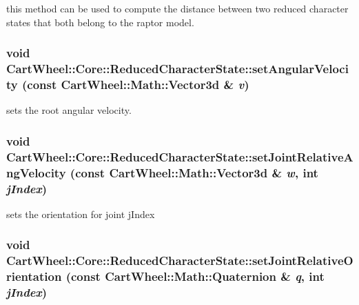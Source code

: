 \label{classCartWheel_1_1Core_1_1ReducedCharacterState_ac18db83455bbd84305928cdf1330ceb1}
this method can be used to compute the distance between two reduced character states that both belong to the raptor model. \hypertarget{classCartWheel_1_1Core_1_1ReducedCharacterState_aae884d8d365bea8c9ca4e0b6b59bc25c}{
\subsubsection[{setAngularVelocity}]{\setlength{\rightskip}{0pt plus 5cm}void CartWheel::Core::ReducedCharacterState::setAngularVelocity (const {\bf CartWheel::Math::Vector3d} \& {\em v})}}
\label{classCartWheel_1_1Core_1_1ReducedCharacterState_aae884d8d365bea8c9ca4e0b6b59bc25c}
sets the root angular velocity. \hypertarget{classCartWheel_1_1Core_1_1ReducedCharacterState_ae11d4640b70a6168de15e676ab65977f}{
\subsubsection[{setJointRelativeAngVelocity}]{\setlength{\rightskip}{0pt plus 5cm}void CartWheel::Core::ReducedCharacterState::setJointRelativeAngVelocity (const {\bf CartWheel::Math::Vector3d} \& {\em w}, \/  int {\em jIndex})}}
\label{classCartWheel_1_1Core_1_1ReducedCharacterState_ae11d4640b70a6168de15e676ab65977f}
sets the orientation for joint jIndex \hypertarget{classCartWheel_1_1Core_1_1ReducedCharacterState_a84a0a6a1f1525c630cf4bb8549a0eca5}{
\subsubsection[{setJointRelativeOrientation}]{\setlength{\rightskip}{0pt plus 5cm}void CartWheel::Core::ReducedCharacterState::setJointRelativeOrientation (const {\bf CartWheel::Math::Quaternion} \& {\em q}, \/  int {\em jIndex})}}
